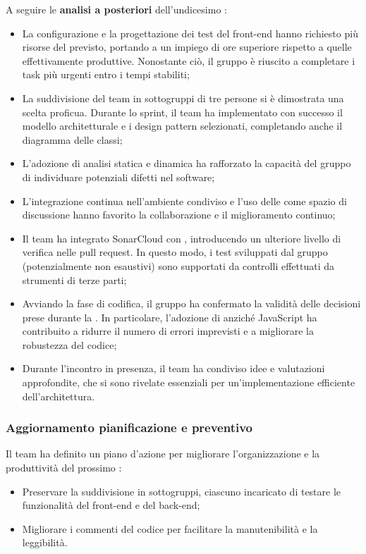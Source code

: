 \vspace{0.5\baselineskip}
\par A seguire le \textbf{analisi a posteriori} dell'undicesimo :
\begin{itemize}
  \item La configurazione e la progettazione dei test del front-end hanno richiesto più risorse del previsto, portando a un impiego di ore superiore rispetto a quelle effettivamente produttive. Nonostante ciò, il gruppo è riuscito a completare i task più urgenti entro i tempi stabiliti;
  \item La suddivisione del team in sottogruppi di tre persone si è dimostrata una scelta proficua. Durante lo sprint, il team ha implementato con successo il modello architetturale e i design pattern selezionati, completando anche il diagramma delle classi;
  \item L'adozione di analisi statica e dinamica ha rafforzato la capacità del gruppo di individuare potenziali difetti nel software;
  \item L'integrazione continua nell'ambiente condiviso e l'uso delle  come spazio di discussione hanno favorito la collaborazione e il miglioramento continuo;
  \item Il team ha integrato SonarCloud con , introducendo un ulteriore livello di verifica nelle pull request. In questo modo, i test sviluppati dal gruppo (potenzialmente non esaustivi) sono supportati da controlli effettuati da strumenti di terze parti;
  \item Avviando la fase di codifica, il gruppo ha confermato la validità delle decisioni prese durante la . In particolare, l'adozione di  anziché JavaScript ha contribuito a ridurre il numero di errori imprevisti e a migliorare la robustezza del codice;
  \item Durante l'incontro in presenza, il team ha condiviso idee e valutazioni approfondite, che si sono rivelate essenziali per un'implementazione efficiente dell'architettura.
\end{itemize}

\subsubsection{Aggiornamento pianificazione e preventivo}
\par Il team ha definito un piano d'azione per migliorare l'organizzazione e la produttività del prossimo :
\begin{itemize}
  \item Preservare la suddivisione in sottogruppi, ciascuno incaricato di testare le funzionalità del front-end e del back-end;
  \item Migliorare i commenti del codice per facilitare la manutenibilità e la leggibilità.
\end{itemize}


